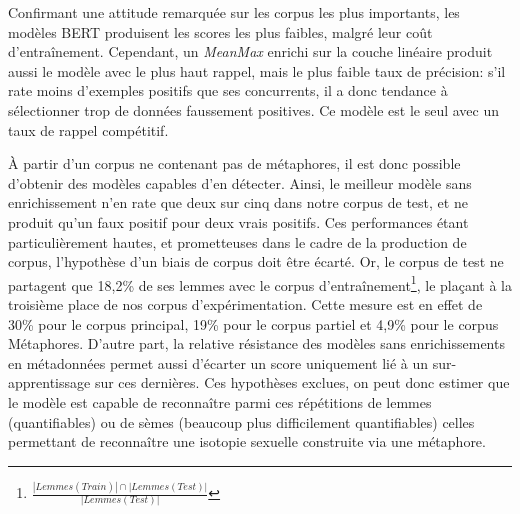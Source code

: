 Confirmant une attitude remarquée sur les corpus les plus importants, les modèles BERT produisent les scores les plus faibles, malgré leur coût d'entraînement. Cependant, un \textit{MeanMax} enrichi sur la couche linéaire produit aussi le modèle avec le plus haut rappel, mais le plus faible taux de précision: s'il rate moins d'exemples positifs que ses concurrents, il a donc tendance à sélectionner trop de données faussement positives. Ce modèle est le seul avec un taux de rappel compétitif.

À partir d'un corpus ne contenant pas de métaphores, il est donc possible d'obtenir des modèles capables d'en détecter. Ainsi, le meilleur modèle sans enrichissement n'en rate que deux sur cinq dans notre corpus de test, et ne produit qu'un faux positif pour deux vrais positifs. Ces performances étant particulièrement hautes, et prometteuses dans le cadre de la production de corpus, l'hypothèse d'un biais de corpus doit être écarté. Or, le corpus de test ne partagent que 18,2\% de ses lemmes avec le corpus d'entraînement\footnote{$\frac{|Lemmes(Train)| \cap |Lemmes(Test)|}{|Lemmes(Test)|}$}, le plaçant à la troisième place de nos corpus d'expérimentation. Cette mesure est en effet de 30\% pour le corpus principal, 19\% pour le corpus partiel et 4,9\% pour le corpus Métaphores. D'autre part, la relative résistance des modèles sans enrichissements en métadonnées permet aussi d'écarter un score uniquement lié à un sur-apprentissage sur ces dernières. Ces hypothèses exclues, on peut donc estimer que le modèle est capable de reconnaître parmi ces répétitions de lemmes (quantifiables) ou de sèmes (beaucoup plus difficilement quantifiables) celles permettant de reconnaître une isotopie sexuelle construite via une métaphore.

